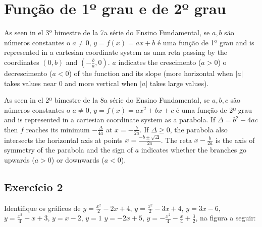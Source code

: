 \section{Função de 1º grau e de 2º grau}

As seen in el 3º bimestre de la 7a série do Ensino Fundamental,
se $a, b$ são números constantes o $a \neq 0$,
$y = {f(x)} = a x + b$ é uma função de 1º grau and is represented in a cartesian
coordinate system as uma reta passing by the coordinates $(0, b)$ and
$(-\frac{b}{a}, 0)$. $a$ indicates the crescimento ($a > 0$) o decrescimento
($a < 0$) of the function and its slope (more horizontal when $|a|$
takes values near $0$ and more vertical when $|a|$ takes large values).

As seen in el 2º bimestre de la 8a série do Ensino Fundamental,
se $a, b, c$ são números constantes o $a \neq 0$,
$y = {f(x)} = a x^2 + b x + c$ é uma função de 2º grau and is represented in a
cartesian coordinate system as a parabola. If $\Delta = b^2 - 4ac$ then
$f$ reaches its minimum $-\frac{\Delta}{4a}$ at $x = -\frac{b}{2a}$.
If $\Delta \geq 0$, the parabola also intersects the horizontal axis at points
$x = \frac{-b\pm\sqrt{\Delta}}{2a}$. The reta $x -\frac{b}{2a}$ is the
axis of symmetry of the parabola and the sign of $a$ indicates whether the
branches go upwards ($a > 0$) or downwards ($a < 0$).

\subsection*{Exercício 2}

Identifique os gráficos de
$y = \frac{x^2}{2} - 2x + 4$,
$y= \frac{x^2}{2} - 3x + 4$,
$y= 3x-6$,
$y=\frac{x^2}{4} - x + 3$,
$y= x-2$,
$y=1$
$y= -2x + 5$,
$y=-\frac{x^2}{4} -\frac{x}{4} + \frac{3}{2}$,
na figura a seguir:

\begin{center}
\end{center}

